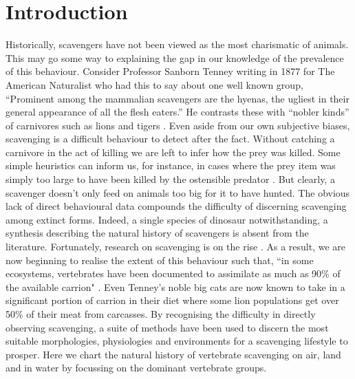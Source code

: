 \documentclass[a4paper,12pt]{article}
\begin{document}
\section*{Introduction}
Historically, scavengers have not been viewed as the most charismatic of animals. This may go some way to explaining the gap in our knowledge of the prevalence of this behaviour. Consider Professor Sanborn Tenney writing in 1877 for The American Naturalist who had this to say about one well known group, “Prominent among the mammalian scavengers are the hyenas, the ugliest in their general appearance of all the flesh eaters.” He contrasts these with “nobler kinds” of carnivores such as lions and tigers \citep{tenney1877few}. Even aside from our own subjective biases, scavenging is a difficult behaviour to detect after the fact. Without catching a carnivore in the act of killing we are left to infer how the prey was killed. Some simple heuristics can inform us, for instance, in cases where the prey item was simply too large to have been killed by the ostensible predator \citep{pobiner2008paleoecological}. But clearly, a scavenger doesn’t only feed on animals too big for it to have hunted. The obvious lack of direct behavioural data compounds the difficulty of discerning scavenging among extinct forms. Indeed, a single species of dinosaur notwithstanding, a synthesis describing the natural history of scavengers is absent from the literature. Fortunately, research on scavenging is on the rise \citep{manga2006vulture}. As a result, we are now beginning to realise the extent of this behaviour such that, “in some ecosystems, vertebrates have been documented to assimilate as much as 90\% of the available carrion" \citep{benbow2015introduction}. Even Tenney’s noble big cats are now known to take in a significant portion of carrion in their diet where some lion populations get over 50\% of their meat from carcasses. By recognising the difficulty in directly observing scavenging, a suite of methods have been used to discern the most suitable morphologies, physiologies and environments for a scavenging lifestyle to prosper. Here we chart the natural history of vertebrate scavenging on air, land and in water by focussing on the dominant vertebrate groups. %
\end{document}
